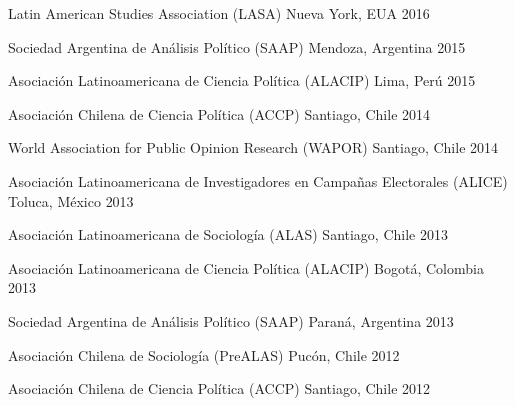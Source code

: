 \begin{cvhonors}
\cvconf
{Latin American Studies Association (LASA)} 
{Nueva York, EUA}
{2016}
\end{cvhonors}

\begin{cvhonors}
\cvconf
{Sociedad Argentina de Análisis Político (SAAP)} 
{Mendoza, Argentina}
{2015}
\end{cvhonors}

\begin{cvhonors}
\cvconf
{Asociación Latinoamericana de Ciencia Política (ALACIP)} 
{Lima, Perú}
{2015}
\end{cvhonors}

\begin{cvhonors}
\cvconf
{Asociación Chilena de Ciencia Política (ACCP)} 
{Santiago, Chile}
{2014}
\end{cvhonors}

\begin{cvhonors}
\cvconf
{World Association for Public Opinion Research (WAPOR)} 
{Santiago, Chile}
{2014}
\end{cvhonors}

\begin{cvhonors}
\cvconf
{Asociación Latinoamericana de Investigadores en Campañas Electorales (ALICE)} 
{Toluca, México}
{2013}
\end{cvhonors}

\begin{cvhonors}
\cvconf
{Asociación Latinoamericana de Sociología (ALAS)} 
{Santiago, Chile}
{2013}
\end{cvhonors}

\begin{cvhonors}
\cvconf
{Asociación Latinoamericana de Ciencia Política (ALACIP)} 
{Bogotá, Colombia}
{2013}
\end{cvhonors}

\begin{cvhonors}
\cvconf
{Sociedad Argentina de Análisis Político (SAAP)} 
{Paraná, Argentina}
{2013}
\end{cvhonors}

\begin{cvhonors}
\cvconf
{Asociación Chilena de Sociología (PreALAS)} 
{Pucón, Chile}
{2012}
\end{cvhonors}

\begin{cvhonors}
\cvconf
{Asociación Chilena de Ciencia Política (ACCP)} 
{Santiago, Chile}
{2012}
\end{cvhonors}

